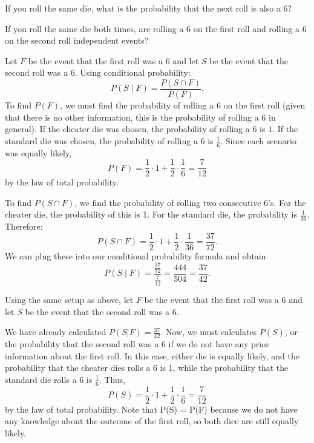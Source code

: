 \documentclass[12pt]{exam}
\begin{document}
\begin{qparts}
    \item If you roll the same die, what is the probability that the next roll is also a 6?
    \item If you roll the same die both times, are rolling a 6 on the first roll and rolling a 6 on the second roll independent events?
\end{qparts}

\begin{solution}

\begin{qparts} 
    \item Let $F$ be the event that the first roll was a 6 and let $S$ be the event that the second roll was a 6. Using conditional probability:
    $$P(S \mid F) = \frac{P(S \cap F)}{P(F)}.$$
    To find $P(F)$, we must find the probability of rolling a 6 on the first roll (given that there is no other information, this is the probability of rolling a 6 in general). If the cheater die was chosen, the probability of rolling a 6 is $1$. If the standard die was chosen, the probability of rolling a 6 is $\frac{1}{6}$. Since each scenario was equally likely, $$P(F) = \frac{1}{2} \cdot 1 + \frac{1}{2} \cdot \frac{1}{6} = \frac{7}{12}$$
    by the law of total probability.
    
    To find $P(S \cap F)$, we find the probability of rolling two consecutive 6's. For the cheater die, the probability of this is 1. For the standard die, the probability is $\frac{1}{36}$. Therefore: $$P(S\cap F) = \frac{1}{2} \cdot 1 + \frac{1}{2} \cdot \frac{1}{36} = \frac{37}{72}.$$
    We can plug these into our conditional probability formula and obtain $$P(S\mid F) = \frac{\frac{37}{72}}{\frac{7}{12}} = \frac{444}{504} = \frac{37}{42}.$$

    \item Using the same setup as above, let $F$ be the event that the first roll was a 6 and let $S$ be the event that the second roll was a 6.

    We have already calculated $P(S | F) = \frac{37}{42}$. Now, we must calculates $P(S)$, or the probability that the second roll was a 6 if we do not have any prior information about the first roll. In this case, either die is equally likely, and the probability that the cheater dies rolls a 6 is 1, while the probability that the standard die rolls a 6 is $\frac{1}{6}$. Thus, $$P(S) = \frac{1}{2} \cdot 1 + \frac{1}{2} \cdot \frac{1}{6} = \frac{7}{12}$$ by the law of total probability. Note that P(S) = P(F) because we do not have any knowledge about the outcome of the first roll, so both dice are still equally likely.


\end{qparts}
\end{solution}
\end{document}
